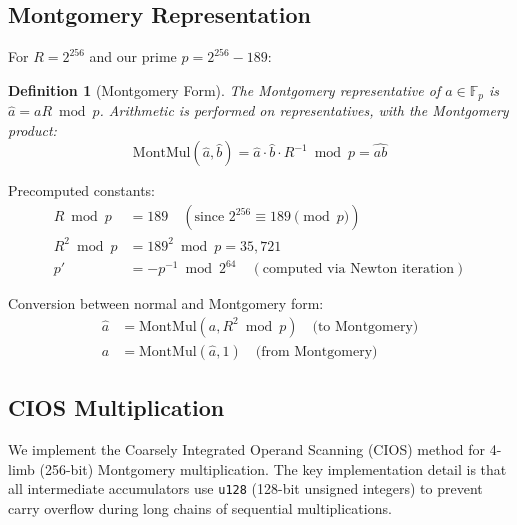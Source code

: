 \documentclass[11pt,a4paper]{article}
\newtheorem{definition}{Definition}[section]
\begin{document}
\subsection{Montgomery Representation}

For $R = 2^{256}$ and our prime $p = 2^{256} - 189$:

\begin{definition}[Montgomery Form]
The Montgomery representative of $a \in \mathbb{F}_p$ is $\hat{a} = aR \bmod p$. Arithmetic is performed on representatives, with the Montgomery product:
\begin{equation}
    \mathrm{MontMul}(\hat{a}, \hat{b}) = \hat{a} \cdot \hat{b} \cdot R^{-1} \bmod p = \widehat{ab}
\end{equation}
\end{definition}

Precomputed constants:
\begin{align}
    R \bmod p &= 189 \quad (\text{since } 2^{256} \equiv 189 \pmod{p}) \\
    R^2 \bmod p &= 189^2 \bmod p = 35{,}721 \\
    p' &= -p^{-1} \bmod 2^{64} \quad (\text{computed via Newton iteration})
\end{align}

Conversion between normal and Montgomery form:
\begin{align}
    \hat{a} &= \mathrm{MontMul}(a, R^2 \bmod p) \quad \text{(to Montgomery)} \\
    a &= \mathrm{MontMul}(\hat{a}, 1) \quad \text{(from Montgomery)}
\end{align}

\subsection{CIOS Multiplication}

We implement the Coarsely Integrated Operand Scanning (CIOS) method for 4-limb (256-bit) Montgomery multiplication. The key implementation detail is that all intermediate accumulators use \texttt{u128} (128-bit unsigned integers) to prevent carry overflow during long chains of sequential multiplications.
\end{document}
